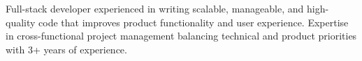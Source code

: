 

\begin{cvparagraph}

Full-stack developer experienced in writing scalable, manageable, and high-quality code that improves product functionality and user experience.  Expertise in cross-functional project management balancing technical and product priorities with 3+ years of experience.
\end{cvparagraph}
